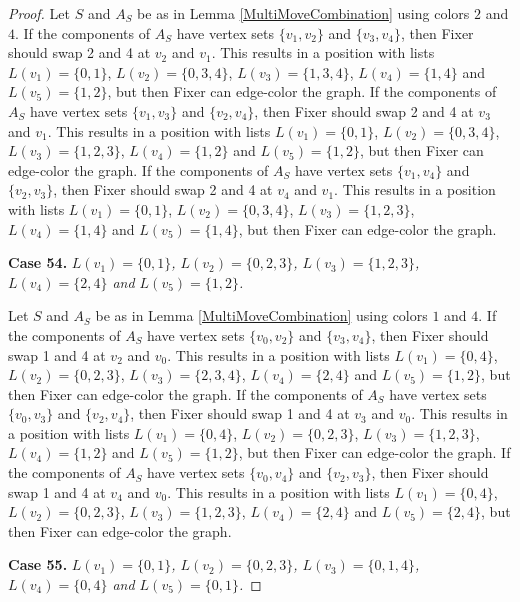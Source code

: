 \documentclass[12pt]{amsart}
\theoremstyle{plain}
\theoremstyle{definition}
\theoremstyle{remark}
\begin{document}
\begin{proof}
Let $S$ and $A_S$ be as in Lemma \ref{MultiMoveCombination} using colors $2$ and $4$. If the components of $A_S$ have vertex sets $\{v_1, v_2\}$ and $\{v_3, v_4\}$, then Fixer should swap 2 and 4 at $v_2$ and $v_1$. This results in a position with lists $L(v_1) = \{0, 1\}$, $L(v_2) = \{0, 3, 4\}$, $L(v_3) = \{1, 3, 4\}$, $L(v_4) = \{1, 4\}$ and $L(v_5) = \{1, 2\}$, but then Fixer can edge-color the graph.
If the components of $A_S$ have vertex sets $\{v_1, v_3\}$ and $\{v_2, v_4\}$, then Fixer should swap 2 and 4 at $v_3$ and $v_1$. This results in a position with lists $L(v_1) = \{0, 1\}$, $L(v_2) = \{0, 3, 4\}$, $L(v_3) = \{1, 2, 3\}$, $L(v_4) = \{1, 2\}$ and $L(v_5) = \{1, 2\}$, but then Fixer can edge-color the graph.
If the components of $A_S$ have vertex sets $\{v_1, v_4\}$ and $\{v_2, v_3\}$, then Fixer should swap 2 and 4 at $v_4$ and $v_1$. This results in a position with lists $L(v_1) = \{0, 1\}$, $L(v_2) = \{0, 3, 4\}$, $L(v_3) = \{1, 2, 3\}$, $L(v_4) = \{1, 4\}$ and $L(v_5) = \{1, 4\}$, but then Fixer can edge-color the graph.

\noindent\textbf{Case 54.  }\textit{$L(v_1) = \{0, 1\}$, $L(v_2) = \{0, 2, 3\}$, $L(v_3) = \{1, 2, 3\}$, $L(v_4) = \{2, 4\}$ and $L(v_5) = \{1, 2\}$.}

Let $S$ and $A_S$ be as in Lemma \ref{MultiMoveCombination} using colors $1$ and $4$. If the components of $A_S$ have vertex sets $\{v_0, v_2\}$ and $\{v_3, v_4\}$, then Fixer should swap 1 and 4 at $v_2$ and $v_0$. This results in a position with lists $L(v_1) = \{0, 4\}$, $L(v_2) = \{0, 2, 3\}$, $L(v_3) = \{2, 3, 4\}$, $L(v_4) = \{2, 4\}$ and $L(v_5) = \{1, 2\}$, but then Fixer can edge-color the graph.
If the components of $A_S$ have vertex sets $\{v_0, v_3\}$ and $\{v_2, v_4\}$, then Fixer should swap 1 and 4 at $v_3$ and $v_0$. This results in a position with lists $L(v_1) = \{0, 4\}$, $L(v_2) = \{0, 2, 3\}$, $L(v_3) = \{1, 2, 3\}$, $L(v_4) = \{1, 2\}$ and $L(v_5) = \{1, 2\}$, but then Fixer can edge-color the graph.
If the components of $A_S$ have vertex sets $\{v_0, v_4\}$ and $\{v_2, v_3\}$, then Fixer should swap 1 and 4 at $v_4$ and $v_0$. This results in a position with lists $L(v_1) = \{0, 4\}$, $L(v_2) = \{0, 2, 3\}$, $L(v_3) = \{1, 2, 3\}$, $L(v_4) = \{2, 4\}$ and $L(v_5) = \{2, 4\}$, but then Fixer can edge-color the graph.

\noindent\textbf{Case 55.  }\textit{$L(v_1) = \{0, 1\}$, $L(v_2) = \{0, 2, 3\}$, $L(v_3) = \{0, 1, 4\}$, $L(v_4) = \{0, 4\}$ and $L(v_5) = \{0, 1\}$.}


\end{proof}
\end{document}
